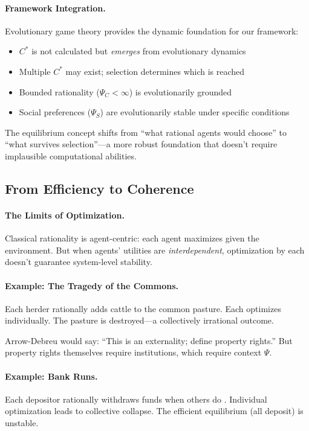 \paragraph{Framework Integration.}
Evolutionary game theory provides the dynamic foundation for our framework:
\begin{itemize}
  \item $C^*$ is not calculated but \emph{emerges} from evolutionary dynamics
  \item Multiple $C^*$ may exist; selection determines which is reached
  \item Bounded rationality ($\Psi_C < \infty$) is evolutionarily grounded
  \item Social preferences ($\Psi_S$) are evolutionarily stable under specific conditions
\end{itemize}

The equilibrium concept shifts from ``what rational agents would choose'' to
``what survives selection''---a more robust foundation that doesn't require
implausible computational abilities.

\subsection{From Efficiency to Coherence}

\paragraph{The Limits of Optimization.}
Classical rationality is agent-centric: each agent maximizes given the environment.
But when agents' utilities are \emph{interdependent}, optimization by each
doesn't guarantee system-level stability.

\paragraph{Example: The Tragedy of the Commons.}
Each herder rationally adds cattle to the common pasture.
Each optimizes individually.
The pasture is destroyed---a collectively irrational outcome.

Arrow-Debreu would say: ``This is an externality; define property rights.''
But property rights themselves require institutions, which require context $\Psi$.

\paragraph{Example: Bank Runs.}
Each depositor rationally withdraws funds when others do \citep{diamonddybvig1983}.
Individual optimization leads to collective collapse.
The efficient equilibrium (all deposit) is unstable.

